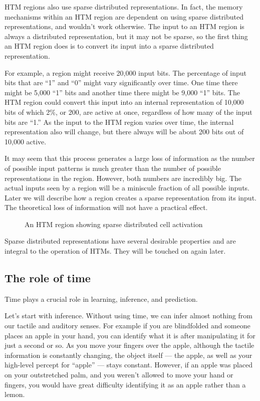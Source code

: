 \documentclass{report}
\begin{document}
HTM regions also use sparse distributed representations. In fact, the
memory mechanisms within an HTM region are dependent on using sparse
distributed representations, and wouldn't work otherwise. The input to
an HTM region is always a distributed representation, but it may not
be sparse, so the first thing an HTM region does is to convert its
input into a sparse distributed representation.

For example, a region might receive 20,000 input bits. The percentage
of input bits that are ``1'' and ``0'' might vary significantly over
time. One time there might be 5,000 ``1'' bits and another time there
might be 9,000 ``1'' bits. The HTM region could convert this input
into an internal representation of 10,000 bits of which 2\%, or 200,
are active at once, regardless of how many of the input bits are
``1.'' As the input to the HTM region varies over time, the internal
representation also will change, but there always will be about 200
bits out of 10,000 active.

It may seem that this process generates a large loss of information as
the number of possible input patterns is much greater than the number
of possible representations in the region. However, both numbers are
incredibly big. The actual inputs seen by a region will be a miniscule
fraction of all possible inputs. Later we will describe how a region
creates a sparse representation from its input. The theoretical loss
of information will not have a practical effect.

\begin{figure}
\caption{An HTM region showing sparse distributed cell activation}
\label{figure:sparse-activation}
\end{figure}

Sparse distributed representations have several desirable properties
and are integral to the operation of HTMs. They will be touched on
again later.

\subsection*{The role of time}

Time plays a crucial role in learning, inference, and prediction.

Let's start with inference. Without using time, we can infer almost
nothing from our tactile and auditory senses. For example if you are
blindfolded and someone places an apple in your hand, you can identify
what it is after manipulating it for just a second or so. As you move
your fingers over the apple, although the tactile information is
constantly changing, the object itself --- the apple, as well as your
high-level percept for ``apple'' --- stays constant. However, if an
apple was placed on your outstretched palm, and you weren't allowed to
move your hand or fingers, you would have great difficulty identifying
it as an apple rather than a lemon.
\end{document}
